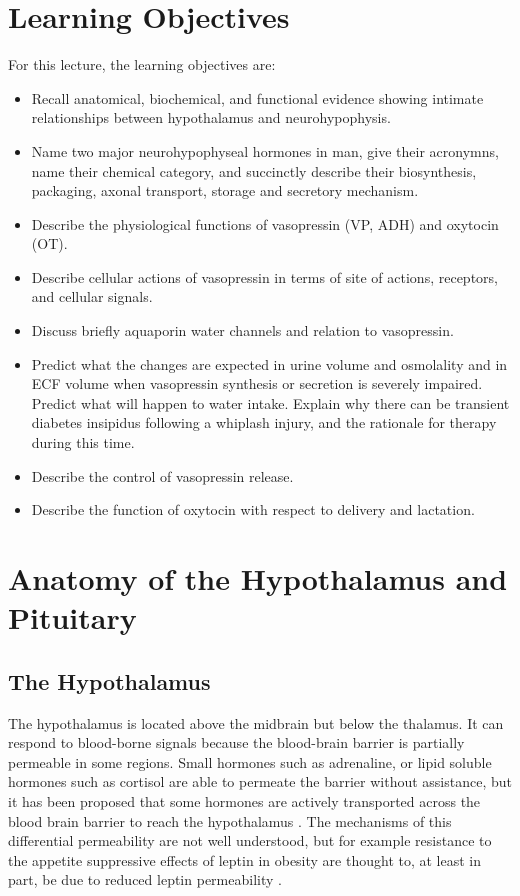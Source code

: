 \documentclass{tufte-handout}
\begin{document}
\section{Learning Objectives}
For this lecture, the learning objectives are:
\begin{itemize}
\item Recall anatomical, biochemical, and functional evidence showing intimate relationships between hypothalamus and neurohypophysis.
\item Name two major neurohypophyseal hormones in man, give their acronymns, name their chemical category, and succinctly describe their biosynthesis, packaging, axonal transport, storage and secretory mechanism.
\item Describe the physiological functions of vasopressin (VP, ADH) and oxytocin (OT).
\item Describe cellular actions of vasopressin in terms of site of actions, receptors, and cellular signals.
\item Discuss briefly aquaporin water channels and relation to vasopressin. 
\item Predict what the changes are expected in urine volume and osmolality and in ECF volume when vasopressin synthesis or secretion is severely impaired. Predict what will happen to water intake. Explain why there can be transient diabetes insipidus following a whiplash injury, and the rationale for therapy during this time. 
\item Describe the control of vasopressin release.
\item Describe the function of oxytocin with respect to delivery and lactation.


\end{itemize}

\pagebreak

\section{Anatomy of the Hypothalamus and Pituitary}

\subsection{The Hypothalamus}

The hypothalamus is located above the midbrain but below the thalamus.  It can respond to blood-borne signals because the blood-brain barrier is partially permeable in some regions.  Small hormones such as adrenaline, or lipid soluble hormones such as cortisol are able to permeate the barrier without assistance, but it has been proposed that some hormones are actively transported across the blood brain barrier to reach the hypothalamus \cite{Huber2001}.  The mechanisms of this differential permeability are not well understood, but for example resistance to the appetite suppressive effects of leptin in obesity are thought to, at least in part, be due to reduced leptin permeability \cite{Burguera2000}. 
\end{document}
